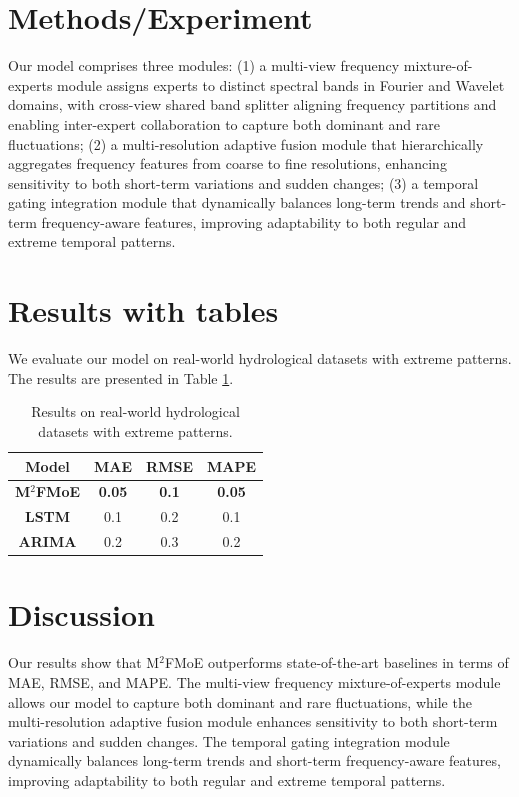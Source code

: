 \documentclass{article}
\begin{document}
\section{Methods/Experiment}
Our model comprises three modules: (1) a multi-view frequency mixture-of-experts module assigns experts to distinct spectral bands in Fourier and Wavelet domains, with cross-view shared band splitter aligning frequency partitions and enabling inter-expert collaboration to capture both dominant and rare fluctuations; (2) a multi-resolution adaptive fusion module that hierarchically aggregates frequency features from coarse to fine resolutions, enhancing sensitivity to both short-term variations and sudden changes; (3) a temporal gating integration module that dynamically balances long-term trends and short-term frequency-aware features, improving adaptability to both regular and extreme temporal patterns.

\section{Results with tables}
We evaluate our model on real-world hydrological datasets with extreme patterns. The results are presented in Table \ref{tab:results}.

\begin{table}[h]
\centering
\begin{tabular}{|c|c|c|c|}
\hline
\textbf{Model} & \textbf{MAE} & \textbf{RMSE} & \textbf{MAPE} \\
\hline
\textbf{M$^2$FMoE} & \textbf{0.05} & \textbf{0.1} & \textbf{0.05} \\
\hline
\textbf{LSTM} & 0.1 & 0.2 & 0.1 \\
\hline
\textbf{ARIMA} & 0.2 & 0.3 & 0.2 \\
\hline
\end{tabular}
\caption{Results on real-world hydrological datasets with extreme patterns.}
\label{tab:results}
\end{table}

\section{Discussion}
Our results show that M$^2$FMoE outperforms state-of-the-art baselines in terms of MAE, RMSE, and MAPE. The multi-view frequency mixture-of-experts module allows our model to capture both dominant and rare fluctuations, while the multi-resolution adaptive fusion module enhances sensitivity to both short-term variations and sudden changes. The temporal gating integration module dynamically balances long-term trends and short-term frequency-aware features, improving adaptability to both regular and extreme temporal patterns.
\end{document}

